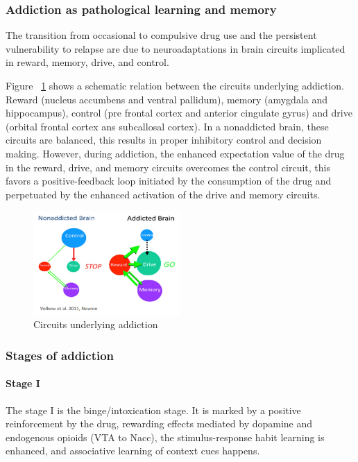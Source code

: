 \documentclass[12pt,article,oneside,a4paper]{memoir}
\begin{document}
\subsubsection{Addiction as pathological learning and memory}
The transition from occasional to compulsive drug use and the persistent vulnerability to relapse are due to neuroadaptations in brain circuits implicated in reward, memory, drive, and control.

Figure ~\ref{fig:circuits-drug-addiction} shows a schematic relation between the circuits underlying addiction. Reward (nucleus accumbens and ventral pallidum), memory (amygdala and hippocampus), control (pre frontal cortex and anterior cingulate gyrus) and drive (orbital frontal cortex ans subcallosal cortex). In a nonaddicted brain, these circuits are balanced, this results in proper inhibitory control and decision making. However, during addiction, the enhanced expectation value of the drug in the reward, drive, and memory circuits overcomes the control circuit, this favors a positive-feedback loop initiated by the consumption of the drug and perpetuated by the enhanced activation of the drive and memory circuits. 

\begin{figure}
  \centering
  \includegraphics[width=0.5\textwidth]{imgs/circuits-drug-addiction.png}
  \caption{Circuits underlying addiction}
  \label{fig:circuits-drug-addiction}
\end{figure}


\subsubsection{Stages of addiction}

\paragraph{Stage I}
The stage I is the binge/intoxication stage. It is marked by a positive reinforcement by the drug, rewarding effects mediated by dopamine and endogenous opioids (VTA to Nacc), the stimulus-response habit learning is enhanced, and associative learning of context cues happens.
\end{document}
